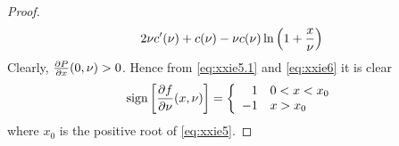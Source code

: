 \documentclass{article}
\begin{document}
\begin{proof}
\begin{eqnarray}
    2 \nu c'(\nu) + c(\nu) - \nu c(\nu) \ln\left(
      1 + {x \over \nu}
    \right)
    \label{eq:xxie6}
  \end{eqnarray}
  Clearly, $\frac{\partial P}{\partial x}(0, \nu) > 0$. Hence from \eqref{eq:xxie5.1} and
  \eqref{eq:xxie6} it is clear
  \begin{equation*}
    \text{sign}\left[
      \frac{\partial f}{\partial \nu}(x, \nu)
    \right]
    = \left\{
    \begin{array}{rl}
      1 & 0 < x < x_0 \\
      -1 & x > x_0
    \end{array}
    \right.
  \end{equation*}
  where $x_0$ is the positive root of \eqref{eq:xxie5}.
\end{proof}



\end{document}

